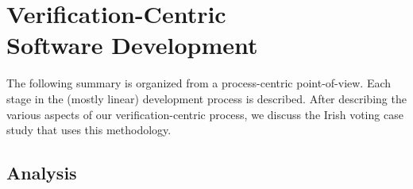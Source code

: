 \documentclass[letterpaper,twocolumn,10pt]{article}
\newcommand{\Votail}{Vot{\'a}il\xspace}
\begin{document}



\section{Verification-Centric\\Software Development}

The following summary is organized from a process-centric
point-of-view.  Each stage in the (mostly linear) development process
is described.  After describing the various aspects of
our verification-centric process, we discuss the Irish voting case
study that uses this methodology.

\subsection{Analysis}
\end{document}
